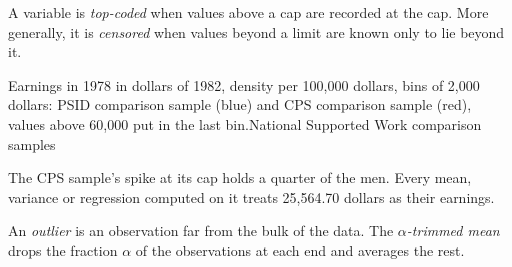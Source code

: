 \begin{definition}\label{def:b1:describing-data:top-coding}
A variable is \emph{top-coded} when values above a cap are recorded at the cap.
More generally, it is \emph{censored} when values beyond a limit are known only
to lie beyond it.
\end{definition}

\label{lst:b1:describing-data:top-coding}

\label{out:b1:describing-data:top-coding}

\begin{omchart}{Earnings in 1978 in dollars of 1982, density per 100,000
dollars, bins of 2,000 dollars: PSID comparison sample (blue) and CPS comparison sample (red),
values above 60,000 put in the last bin.}{National Supported Work comparison
samples}
\end{omchart}

The CPS sample's spike at its cap holds a quarter of the men. Every mean,
variance or regression computed on it treats 25,564.70 dollars as their
earnings.

\begin{definition}\label{def:b1:describing-data:outlier}
An \emph{outlier} is an observation far from the bulk of the data. The
\emph{$\alpha$-trimmed mean} drops the fraction $\alpha$ of the observations at each end and
averages the rest.
\end{definition}

\label{lst:b1:describing-data:trimmed}

